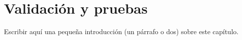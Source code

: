 \chapter{Validación y pruebas}
\label{chap:04valtest}

Escribir aquí una pequeña introducción (un párrafo o dos) sobre este capítulo.
